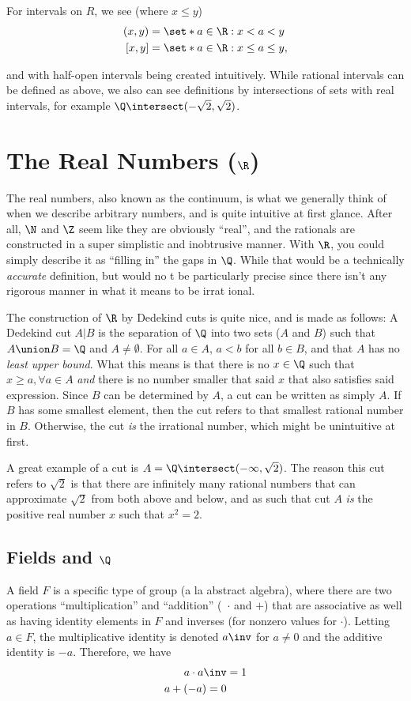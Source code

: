 \documentclass{article}
\begin{document}
For intervals on $R$, we see (where $x \le y$)
\begin{align*}
  (x, y) &= \set*{a \in \R : x < a < y}\\
  [x, y] &= \set*{a \in \R : x \le a \le y},
\end{align*}

and with half-open intervals being created intuitively.
While rational intervals can be defined as above, we also can see definitions by
intersections of sets with real intervals, for example $\Q \intersect (-\sqrt{2}, \sqrt{2})$.

\section{The Real Numbers ($\R$)}
The real numbers, also known as the continuum, is what we generally think of when we describe arbitrary
numbers, and is quite intuitive at first glance. After all, $\N$ and $\Z$ seem like they are obviously ``real'',
and the rationals are constructed in a super simplistic and inobtrusive manner.
With $\R$, you could simply describe it as ``filling in'' the gaps in $\Q$. While that would be a technically \textit{accurate}
definition, but would no
t be particularly precise since there isn't any rigorous manner in what it means to be irrat
ional.

The construction of $\R$ by Dedekind cuts is quite nice, and is made as follows:
A Dedekind cut $A|B$ is the separation of $\Q$ into two sets ($A$ and $B$) such that
$A \union B = \Q$ and $A \ne \emptyset$. For all $a \in A$, $a < b$ for all $b \in B$, and that $A$ has no \textit{least upper bound}.
What this means is that there is no $x \in \Q$ such that $x \ge a, \forall a \in A$ \textit{and} there is no number
smaller that said $x$ that also satisfies said expression. Since $B$ can be determined by $A$, a cut can be written as simply $A$.
If $B$ has some smallest element, then the cut refers to that smallest rational number in $B$. Otherwise, the cut \textit{is}
the irrational number, which might be unintuitive at first.

A great example of a cut is $A = \Q \intersect (-\infty, \sqrt{2})$. The reason this cut refers to $\sqrt{2}$ is that there
are infinitely many rational numbers that can approximate $\sqrt{2}$ from both above and below, and as such that cut $A$ \textit{is}
the positive real number $x$ such that $x^{2} = 2$.

\subsection{Fields and $\Q$}
A field $F$ is a specific type of group (a la abstract algebra), where there are
two operations ``multiplication'' and ``addition''
(\ $\cdot$ and $+$) that are associative as well as having identity elements in
$F$ and inverses (for nonzero values for $\cdot$).
Letting $a \in F$, the multiplicative identity is denoted $a\inv$ for $a \ne 0$
and the additive identity is $-a$.
Therefore, we have
\begin{align*}
  a \cdot a\inv &= 1\\
  a + (-a) = 0
\end{align*}
\end{document}
